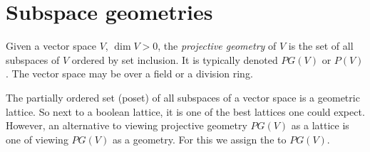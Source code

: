\documentclass[12pt]{article}
\begin{document}
\section{Subspace geometries}

Given a vector space $V$, $\dim V>0$, the \emph{projective geometry} of $V$ is the set of all subspaces of $V$ ordered by set inclusion.  It is typically denoted $PG(V)$ or $P(V)$.  The vector space may be over a field or a division ring.  

The partially ordered set (poset) of all subspaces of a vector space is a geometric lattice.  So next to a boolean lattice, it is one of the best lattices one could expect.  However, an alternative to viewing projective geometry $PG(V)$ as a lattice is one of viewing $PG(V)$ as a geometry.  For this we assign the  to $PG(V)$.
\end{document}
